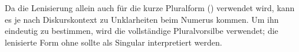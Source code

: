 \subsubsection{} Da die Lenisierung allein auch für die kurze Pluralform () verwendet wird, kann es je nach Diskurskontext zu Unklarheiten beim Numerus kommen. Um ihn eindeutig zu bestimmen, wird die vollständige Pluralvorsilbe  verwendet; die lenisierte Form ohne  sollte als Singular interpretiert werden.
\label{syn:adp:short-plural}


%
%
%
%
%
